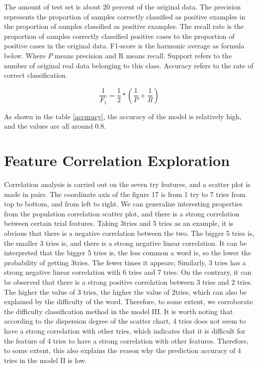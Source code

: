 \documentclass[
  journal=medium,
  manuscript=Report,
  year=2023,
  volume=37,
]{cup-journal}
\begin{document}
The amount of test set is about 20 percent of the original data. The precision represents the proportion of samples correctly classified as positive examples in the proportion of samples classified as positive examples. The recall rate is the proportion of samples correctly classified positive cases to the proportion of positive cases in the original data. F1-score is the harmonic average as formula below. Where $P$ means precision and R means recall. Support refers to the number of original real data belonging to this class. Accuracy refers to the rate of correct classification. 

$$\frac{1}{F_1} = \frac{1}{2}*(\frac{1}{P}+\frac{1}{R})$$

As shown in the table \ref{accuracy}, the accuracy of the model is relatively high, and the values are all around 0.8. 

\section{Feature Correlation Exploration}

Correlation analysis is carried out on the seven try features, and a scatter plot is made in pairs. The coordinate axis of the figure 17 is from 1 try to 7 tries from top to bottom, and from left to right. We can generalize interesting properties from the population correlation scatter plot, and there is a strong correlation between certain trial features. Taking 3tries and 5 tries as an example, it is obvious that there is a negative correlation between the two. The bigger 5 tries is, the smaller 3 tries is, and there is a strong negative linear correlation. It can be interpreted that the bigger 5 tries is, the less common a word is, so the lower the probability of getting 3tries. The fewer times it appears; Similarly, 3 tries has a strong negative linear correlation with 6 tries and 7 tries. On the contrary, it can be observed that there is a strong positive correlation between 3 tries and 2 tries. The higher the value of 3 tries, the higher the value of 2tries, which can also be explained by the difficulty of the word. Therefore, to some extent, we corroborate the difficulty classification method in the model III. It is worth noting that according to the dispersion degree of the scatter chart, 4 tries does not seem to have a strong correlation with other tries, which indicates that it is difficult for the feature of 4 tries to have a strong correlation with other features. Therefore, to some extent, this also explains the reason why the prediction accuracy of 4 tries in the model II is low.
\end{document}
